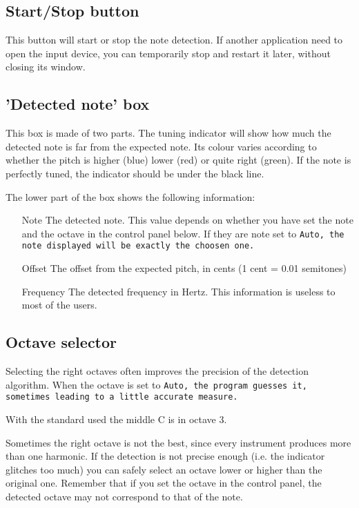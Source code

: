 \subsection{Start/Stop button}\label{startstop}

This button will start or stop the note detection. If another
application need to open the input device, you can temporarily
stop  and restart it later, without closing its
window.

\subsection{'Detected note' box}\label{detectednote}

This box is made of two parts. The tuning indicator will show
how much the detected note is far from the expected note. Its
colour varies according to whether the pitch is higher (blue)
lower (red) or quite right (green). If the note is perfectly
tuned, the indicator should be under the black line.

The lower part of the box shows the following information:
\begin{itemize}
\item[Note] The detected note. This value depends on whether you
have set the note and the octave in the control panel below. If
they are note set to \tt{Auto}, the note displayed will be exactly
the choosen one.
\item[Offset] The offset from the expected pitch, in cents (1 cent = 
0.01 semitones)
\item[Frequency] The detected frequency in Hertz. This information is
useless to most of the users.
\end{itemize}

\subsection{Octave selector}\label{octave}

Selecting the right octaves often improves the precision of the
detection algorithm. When the octave is set to \tt{Auto}, the program
guesses it, sometimes leading to a little accurate measure.

With the standard used the middle C is in octave 3.

Sometimes the right octave is not the best, since every instrument
produces more than one harmonic. If the detection is not precise
enough (i.e. the indicator glitches too much) you can safely select
an octave lower or higher than the original one.
Remember that if you set the octave in the control panel, the detected
octave may not correspond to that of the note.

